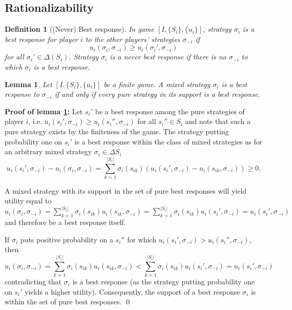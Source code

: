 \documentclass[a4paper,11pt]{article}
\newtheorem{definition}{Definition}
\newtheorem{lemma}{Lemma}
\begin{document}
\subsection{Rationalizability}
\label{sec:rationalizability}

\begin{definition}[(Never) Best response]
In game \([I,\{S_i\},\{u_i\}]\), strategy \(\sigma_i\) is a \emph{best response} for player \(i\) to the other players' strategies \(\sigma_{-i}\) if
$$u_i(\sigma_i,\sigma_{-i})\geq u_i(\sigma_i',\sigma_{-i})$$
for all \(\sigma_i'\in\Delta(S_i)\). Strategy \(\sigma_i\) is a \emph{never best response} if there is no \(\sigma_{-i}\) to which \(\sigma_i\) is a best response.
\end{definition}



\begin{lemma}\label{lem:mixedBRSupport}
Let \([I,\{S_i\},\{u_i\}]\) be a finite game. A mixed strategy $\sigma_i$ is a best response to $\sigma_{-i}$ if and only if every pure strategy in its support is a best response.  
\end{lemma}
\textbf{Proof of lemma \ref{lem:mixedBRSupport}: }
Let $s_i'$ be a best response among the pure strategies of player $i$, i.e. $u_i(s_i',\sigma_{-i})\geq u_i(s_i'',\sigma_{-i})$ for all $s_i''\in S_i$ and note that such a pure strategy exists by the finiteness of the game. The strategy putting probability one on $s_i'$ is a best response within the class of mixed strategies as for an arbitrary mixed strategy $\sigma_i\in\Delta S_i$
\begin{equation*}
  u_i(s_i',\sigma_{-i})-u_i(\sigma_i,\sigma_{-i})=\sum_{k=1}^{|S_i|}\sigma_i(s_{ik})\left(u_i(s_i',\sigma_{-i})-u_i(s_{ik},\sigma_{-i})\right)\geq0.
\end{equation*}

A mixed strategy with its support in the set of pure best responses will yield utility equal to $u_i(\sigma_i,\sigma_{-i})=\sum _{k=1}^{|S_i|}\sigma_i(s_{ik}) u_i(s_{ik},\sigma_{-i})=\sum _{k=1}^{|S_i|}\sigma_i(s_{ik}) u_i(s_i',\sigma_{-i})=u_i(s_i',\sigma_{-i})$ and therefore be a best response itself.

If $\sigma_i$ puts positive probability on a $s_i''$ for which $u_i(s_i',\sigma_{-i})> u_i(s_i'',\sigma_{-i})$, then
\begin{equation*}
  u_i(\sigma_i,\sigma_{-i})=\sum_{k=1}^{|S_i|}\sigma_i(s_{ik}) u_i(s_{ik},\sigma_{-i})<\sum_{k=1}^{|S_i|}\sigma_i(s_{ik}) u_i(s_i',\sigma_{-i})=u_i(s_i',\sigma_{-i})
\end{equation*}
contradicting that $\sigma_i$ is a best response (as the strategy putting probability one on $s_i'$ yields a higher utility). Consequently, the support of a best response $\sigma_i$ is within the set of pure best responses.  \qed
\end{document}

